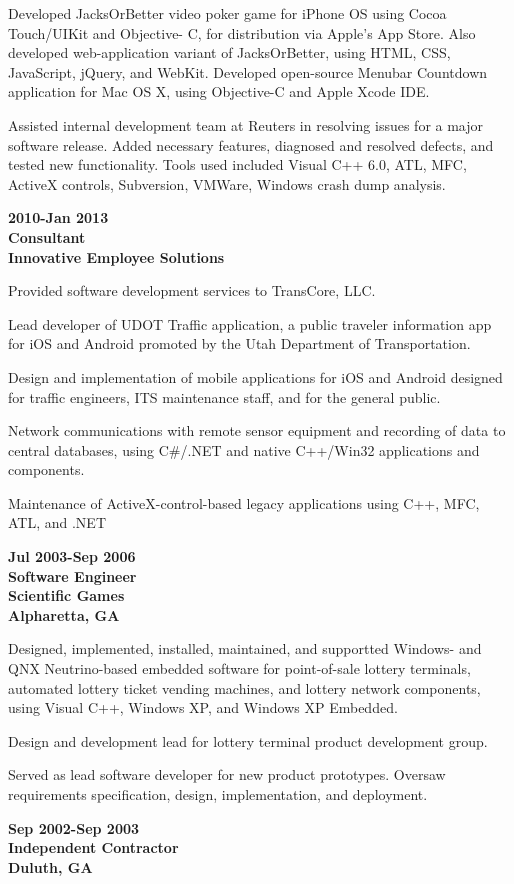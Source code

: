 Developed JacksOrBetter video poker game for iPhone OS using Cocoa
Touch/UIKit and Objective- C, for distribution via Apple's App Store.
Also developed web-application variant of JacksOrBetter, using HTML,
CSS, JavaScript, jQuery, and WebKit. Developed open-source Menubar
Countdown application for Mac OS X, using Objective-C and Apple Xcode
IDE.

Assisted internal development team at Reuters in resolving issues for a
major software release. Added necessary features, diagnosed and resolved
defects, and tested new functionality. Tools used included Visual C++
6.0, ATL, MFC, ActiveX controls, Subversion, VMWare, Windows crash dump
analysis.

\textbf{2010-Jan 2013\\
Consultant\\
Innovative Employee Solutions}

Provided software development services to TransCore, LLC.

Lead developer of UDOT Traffic application, a public traveler
information app for iOS and Android promoted by the Utah Department of
Transportation.

Design and implementation of mobile applications for iOS and Android
designed for traffic engineers, ITS maintenance staff, and for the
general public.

Network communications with remote sensor equipment and recording of
data to central databases, using C\#/.NET and native C++/Win32
applications and components.

Maintenance of ActiveX-control-based legacy applications using C++, MFC,
ATL, and .NET

\textbf{Jul 2003-Sep 2006\\
Software Engineer\\
Scientific Games\\
Alpharetta, GA}

Designed, implemented, installed, maintained, and supportted Windows-
and QNX Neutrino-based embedded software for point-of-sale lottery
terminals, automated lottery ticket vending machines, and lottery
network components, using Visual C++, Windows XP, and Windows XP
Embedded.

Design and development lead for lottery terminal product development
group.

Served as lead software developer for new product prototypes. Oversaw
requirements specification, design, implementation, and deployment.

\textbf{Sep 2002-Sep 2003\\
Independent Contractor\\
Duluth, GA}

